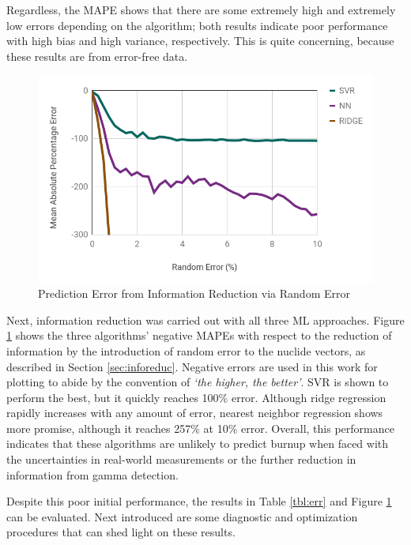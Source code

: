 Regardless, the \gls{MAPE} shows that there are some extremely high and
extremely low errors depending on the algorithm; both results indicate poor
performance with high bias and high variance, respectively.  This is quite
concerning, because these results are from error-free data.

\begin{figure}[!htb]
  \centering
  \includegraphics[width=\linewidth]{./chapters/demo_method/randerr.png}
  \caption{Prediction Error from Information Reduction via Random Error}
  \label{fig:randerr}
\end{figure}

Next, information reduction was carried out with all three \gls{ML} approaches.
Figure \ref{fig:randerr} shows the three algorithms' negative \glspl{MAPE} with
respect to the reduction of information by the introduction of random error to
the nuclide vectors, as described in Section \ref{sec:inforeduc}. Negative
errors are used in this work for plotting to abide by the convention of
\textit{`the higher, the better'}.  \gls{SVR} is shown to perform the best, but
it quickly reaches 100\% error. Although ridge regression rapidly increases
with any amount of error, nearest neighbor regression shows more promise,
although it reaches 257\% at 10\% error.  Overall, this performance indicates
that these algorithms are unlikely to predict burnup when faced with the
uncertainties in real-world measurements or the further reduction in
information from gamma detection.

Despite this poor initial performance, the results in Table \ref{tbl:err} and
Figure \ref{fig:randerr} can be evaluated. Next introduced are some diagnostic
and optimization procedures that can shed light on these results.
